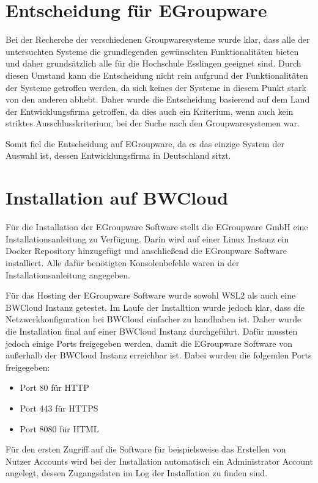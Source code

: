 \section{Entscheidung für EGroupware}

Bei der Recherche der verschiedenen Groupwaresysteme wurde klar, dass alle der untersuchten Systeme die grundlegenden gewünschten Funktionalitäten bieten und daher grundsätzlich alle für die Hochschule Esslingen geeignet sind.
Durch diesen Umstand kann die Entscheidung nicht rein aufgrund der Funktionalitäten der Systeme getroffen werden, da sich keines der Systeme in diesem Punkt stark von den anderen abhebt.
Daher wurde die Entscheidung basierend auf dem Land der Entwicklungsfirma getroffen, da dies auch ein Kriterium, wenn auch kein striktes Ausschlusskriterium, bei der Suche nach den Groupwaresystemen war.

Somit fiel die Entscheidung auf EGroupware, da es das einzige System der Auswahl ist, dessen Entwicklungsfirma in Deutschland sitzt.


\section{Installation auf BWCloud}

Für die Installation der EGroupware Software stellt die EGroupware GmbH eine Installationsanleitung zu Verfügung.
Darin wird auf einer Linux Instanz ein Docker Repository hinzugefügt und anschließend die EGroupware Software installiert.
Alle dafür benötigten Konsolenbefehle waren in der Installationsanleitung angegeben. \autocite{egroupware-installation}

Für das Hosting der EGroupware Software wurde sowohl WSL2 als auch eine BWCloud Instanz getestet.
Im Laufe der Installtion wurde jedoch klar, dass die Netzwerkkonfiguration bei BWCloud einfacher zu handhaben ist.
Daher wurde die Installation final auf einer BWCloud Instanz durchgeführt.
Dafür mussten jedoch einige Ports freigegeben werden, damit die EGroupware Software von außerhalb der BWCloud Instanz erreichbar ist.
Dabei wurden die folgenden Ports freigegeben:
\begin{itemize}
    \item Port 80 für HTTP
    \item Port 443 für HTTPS
    \item Port 8080 für HTML
\end{itemize}

Für den ersten Zugriff auf die Software für beispielsweise das Erstellen von Nutzer Accounts wird bei der Installation automatisch ein Administrator Account angelegt, dessen Zugangsdaten im Log der Installation zu finden sind.